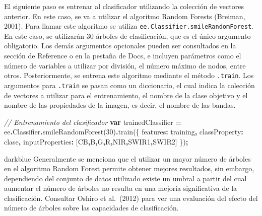 \documentclass[
  12pt,
  letterpaper,
  twoside]{book}
\newenvironment{Shaded}{\begin{snugshade}}{\end{snugshade}}
\newcommand{\AttributeTok}[1]{\textcolor[rgb]{0.77,0.63,0.00}{#1}}
\newcommand{\CommentTok}[1]{\textcolor[rgb]{0.56,0.35,0.01}{\textit{#1}}}
\newcommand{\DataTypeTok}[1]{\textcolor[rgb]{0.13,0.29,0.53}{#1}}
\newcommand{\DecValTok}[1]{\textcolor[rgb]{0.00,0.00,0.81}{#1}}
\newcommand{\FunctionTok}[1]{\textcolor[rgb]{0.00,0.00,0.00}{#1}}
\newcommand{\KeywordTok}[1]{\textcolor[rgb]{0.13,0.29,0.53}{\textbf{#1}}}
\newcommand{\NormalTok}[1]{#1}
\newcommand{\OperatorTok}[1]{\textcolor[rgb]{0.81,0.36,0.00}{\textbf{#1}}}
\newcommand{\StringTok}[1]{\textcolor[rgb]{0.31,0.60,0.02}{#1}}
\begin{document}
El siguiente paso es entrenar al clasificador utilizando la colección de vectores anterior. En este caso, se va a utilizar el algoritmo Random Forests (Breiman, 2001). Para llamar este algoritmo se utiliza \texttt{ee.Classifier.smileRandomForest}. En este caso, se utilizarán 30 árboles de clasificación, que es el único argumento obligatorio. Los demás argumentos opcionales pueden ser consultados en la sección de Reference o en la pestaña de Docs, e incluyen parámetros como el número de variables a utilizar por división, el número máximo de nodos, entre otros. Posteriormente, se entrena este algoritmo mediante el método \texttt{.train}. Los argumentos para \texttt{.train} se pasan como un diccionario, el cual indica la colección de vectores a utilizar para el entrenamiento, el nombre de la clase objetivo y el nombre de las propiedades de la imagen, es decir, el nombre de las bandas.

\begin{Shaded}
\begin{Highlighting}[]
\CommentTok{// Entrenamiento del clasificador}
\KeywordTok{var}\NormalTok{ trainedClassifier }\OperatorTok{=}\NormalTok{ ee}\OperatorTok{.}\AttributeTok{Classifier}\OperatorTok{.}\FunctionTok{smileRandomForest}\NormalTok{(}\DecValTok{30}\NormalTok{)}\OperatorTok{.}\FunctionTok{train}\NormalTok{(\{}
  \DataTypeTok{features}\OperatorTok{:}\NormalTok{ training}\OperatorTok{,}
  \DataTypeTok{classProperty}\OperatorTok{:} \StringTok{\textquotesingle{}clase\textquotesingle{}}\OperatorTok{,}
  \DataTypeTok{inputProperties}\OperatorTok{:}\NormalTok{ [}\StringTok{\textquotesingle{}CB\textquotesingle{}}\OperatorTok{,}\StringTok{\textquotesingle{}B\textquotesingle{}}\OperatorTok{,}\StringTok{\textquotesingle{}G\textquotesingle{}}\OperatorTok{,}\StringTok{\textquotesingle{}R\textquotesingle{}}\OperatorTok{,}\StringTok{\textquotesingle{}NIR\textquotesingle{}}\OperatorTok{,}\StringTok{\textquotesingle{}SWIR1\textquotesingle{}}\OperatorTok{,}\StringTok{\textquotesingle{}SWIR2\textquotesingle{}}\NormalTok{]}
\NormalTok{\})}\OperatorTok{;}
\end{Highlighting}
\end{Shaded}

\begin{bluebox2}

\begin{awesomeblock}{5pt}{\faLightbulb}{darkblue}
Generalmente se menciona que el utilizar un mayor número de árboles en el algoritmo Random Forest permite obtener mejores resultados, sin embargo, dependiendo del conjunto de datos utilizado existe un umbral a partir del cual aumentar el número de árboles no resulta en una mejoría significativa de la clasificación. Consultar Oshiro et al.~(2012) para ver una evaluación del efecto del número de árboles sobre las capacidades de clasificación.

\end{awesomeblock}

\end{bluebox2}
\end{document}
